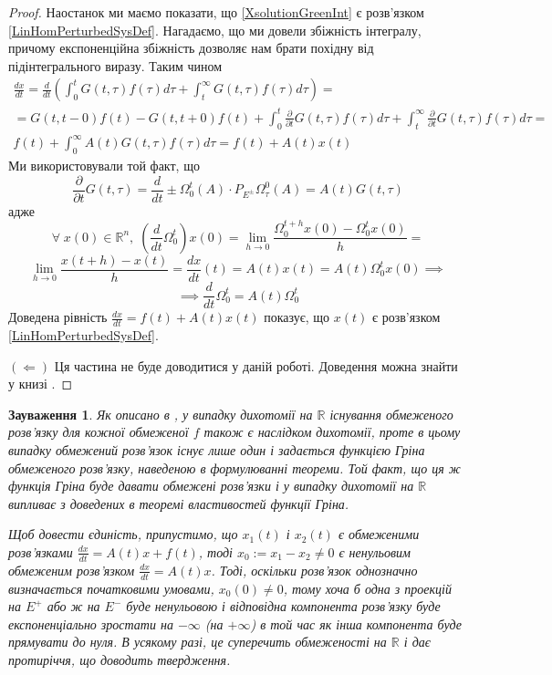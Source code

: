 \documentclass[14pt]{extarticle} %
\let\oldlim\lim
\renewcommand{\lim}{\displaystyle\oldlim}
\let\oldforall\forall
\renewcommand{\forall}{\oldforall\;}
\newtheorem{remark}{Зауваження}
\begin{document}
\begin{proof}
	Наостанок ми маємо показати, що \ref{XsolutionGreenInt} є розв’язком \ref{LinHomPerturbedSysDef}. Нагадаємо, що ми довели збіжність
	інтегралу, причому експоненційна збіжність дозволяє нам брати похідну від підінтегрального виразу. Таким чином
	\begin{gather*}
		\frac{dx}{dt}=\frac{d}{dt}(\int_0^tG(t,\tau)f(\tau)d\tau+\int_t^{\infty}G(t,\tau)f(\tau)d\tau)=\\
		=G(t,t-0)f(t)-G(t,t+0)f(t)+\int_0^t\frac{\partial}{\partial t}G(t,\tau)f(\tau)d\tau+
		\int_t^{\infty}\frac{\partial}{\partial t}G(t,\tau)f(\tau)d\tau=\\
		f(t)+\int_0^{\infty}A(t)G(t,\tau)f(\tau)d\tau=f(t)+A(t)x(t)
	\end{gather*}
	Ми використовували той факт, що
	\[\frac{\partial}{\partial t}G(t,\tau)=\frac{d}{d t}\pm\Omega_0^t(A)\cdot P_{E^{\pm}}\Omega_{\tau}^0(A)=A(t)G(t,\tau)\]
	адже \[\forall x(0)\in\mathbb{R}^n,\;(\frac{d}{dt}\Omega_0^t)x(0)=\lim_{h\to 0}\frac{\Omega_0^{t+h}x(0)-\Omega_0^tx(0)}{h}=\]
	\[\lim_{h\to 0}\frac{x(t+h)-x(t)}{h}=\frac{dx}{dt}(t)=A(t)x(t)=A(t)\Omega_0^tx(0)\implies\]
	\[\implies\frac{d}{dt}\Omega_0^t=A(t)\Omega_0^t\]
	Доведена рівність $\frac{dx}{dt}=f(t)+A(t)x(t)$ показує, що $x(t)$ є розв’язком \ref{LinHomPerturbedSysDef}.

	$(\Longleftarrow)$ Ця частина не буде доводитися у даній роботі. Доведення можна знайти у книзі \cite{krein}.
\end{proof}
\begin{remark}
	Як описано в \cite{mitrop},
	у випадку дихотомії на $\mathbb{R}$ існування обмеженого розв’язку для кожної обмеженої $f$ також є наслідком дихотомії, проте в цьому 
	випадку обмежений розв’язок існує лише один і задається функцією Гріна обмеженого розв’язку, наведеною в формулюванні теореми. Той факт,
	що ця ж функція Гріна буде давати обмежені розв’язки і у випадку дихотомії на $\mathbb{R}$ випливає з доведених в теоремі
	властивостей функції Гріна.

	Щоб довести єдиність, припустимо, що $x_1(t)$ і $x_2(t)$ є обмеженими розв’язками $\frac{dx}{dt}=A(t)x+f(t)$, тоді
	$x_0:=x_1-x_2\neq 0$ є ненульовим обмеженим розв’язком $\frac{dx}{dt}=A(t)x$. Тоді, оскільки розв’язок однозначно визначається
	початковими умовами, $x_0(0)\neq 0$, тому хоча б одна з проекцій на $E^+$ або ж на $E^-$ буде ненульовою і відповідна компонента
	розв’язку буде експоненціально зростати на $-\infty$ (на $+\infty$) в той час як інша компонента буде прямувати до нуля. В усякому разі,
	це суперечить обмеженості на $\mathbb{R}$ і дає протиріччя, що доводить твердження.
\end{remark}
\end{document}
